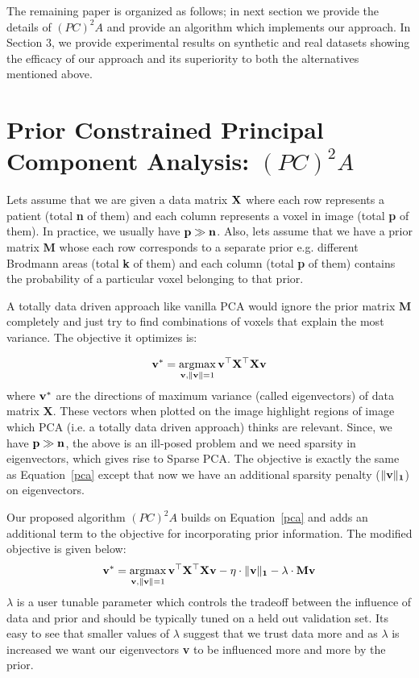 \documentclass{llncs}
\newcommand{\argmax}{\operatornamewithlimits{argmax}}
\begin{document}
The remaining paper is organized as follows; in next section we provide the details of $(PC)^2A$ and provide an algorithm which implements our approach. In Section 3, we provide experimental results on synthetic and real datasets showing the efficacy of our approach and its superiority to both the alternatives mentioned above.


\section{ Prior Constrained Principal Component Analysis: $(PC)^2A$}
Lets assume that we are given a data matrix ${\bf X}$ where each row represents a patient (total {\bf n} of them) and each column represents a voxel in image (total {\bf p} of them). In practice, we usually have ${\bf p \gg n}$. Also, lets assume that we have a prior matrix {\bf M} whose each row corresponds to a separate prior e.g. different Brodmann areas (total {\bf k} of them) and each column (total {\bf p} of them) contains the probability of a particular voxel belonging to that prior.   

A totally data driven approach like vanilla PCA would ignore the prior matrix {\bf M} completely and just try to find combinations of voxels that explain the most variance. The objective it optimizes is:

\begin{equation}
{\bf v^*}= \argmax_{{\bf v},{\bf \|v\|}=1} {\bf v}^{\top}{\bf X^{\top}X}{\bf v}
\label{pca}
\end{equation}
where {$\bf v^*$} are the directions of maximum variance (called eigenvectors) of data matrix {\bf X}. These vectors when plotted on the image highlight regions of image which PCA (i.e. a totally data driven approach) thinks are relevant. Since, we have ${\bf p \gg n}$, the above is an ill-posed problem and we need sparsity in eigenvectors, which gives rise to Sparse PCA. The objective is exactly the same as Equation~\ref{pca} except that now we have an additional sparsity penalty ($\|\bf v \|_1$) on eigenvectors.

Our proposed algorithm $(PC)^2A$ builds on Equation~\ref{pca} and adds an additional term to the objective for incorporating prior information. The modified objective is given below:
\begin{equation}
\label{ppca}
{\bf v^*}= \argmax_{{\bf v},{\bf \|v\|}=1} {\bf v}^{\top}{\bf X^{\top}X}{\bf v} - \eta\cdot\|\bf v \|_1 - \lambda\cdot {\bf Mv}
\end{equation}
$\lambda$ is a user tunable parameter which controls the tradeoff between the influence of data and prior and should be typically tuned on a held out validation set. Its easy to see that smaller values of $\lambda$ suggest that we trust data more and as $\lambda$ is increased we want our eigenvectors {\bf v} to be influenced more and more by the prior.
\end{document}
